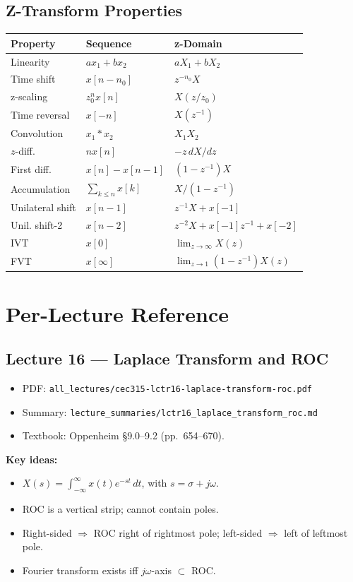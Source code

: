\documentclass[11pt]{article}
\begin{document}
\subsection{Z-Transform Properties}
\begin{center}
\begin{tabular}{|l|l|l|}
\hline
Property & Sequence & z-Domain\\
\hline
Linearity & $ax_1+bx_2$ & $aX_1+bX_2$\\
Time shift & $x[n-n_0]$ & $z^{-n_0}X$\\
z-scaling & $z_0^n x[n]$ & $X(z/z_0)$\\
Time reversal & $x[-n]$ & $X(z^{-1})$\\
Convolution & $x_1*x_2$ & $X_1 X_2$\\
$z$-diff. & $nx[n]$ & $-z\,dX/dz$\\
First diff. & $x[n]-x[n-1]$ & $(1-z^{-1})X$\\
Accumulation & $\sum_{k\le n}x[k]$ & $X/(1-z^{-1})$\\
Unilateral shift & $x[n-1]$ & $z^{-1}X + x[-1]$\\
Unil. shift-2 & $x[n-2]$ & $z^{-2}X + x[-1]z^{-1}+x[-2]$\\
IVT & $x[0]$ & $\lim_{z\to\infty}X(z)$\\
FVT & $x[\infty]$ & $\lim_{z\to 1}(1-z^{-1})X(z)$\\
\hline
\end{tabular}
\end{center}

\section{Per-Lecture Reference}

\subsection{Lecture 16 --- Laplace Transform and ROC}
\begin{itemize}[leftmargin=*]
  \item PDF: \texttt{all\_lectures/cec315-lctr16-laplace-transform-roc.pdf}
  \item Summary: \texttt{lecture\_summaries/lctr16\_laplace\_transform\_roc.md}
  \item Textbook: Oppenheim \S 9.0--9.2 (pp.~654--670).
\end{itemize}
\textbf{Key ideas:}
\begin{itemize}[leftmargin=*]
  \item $X(s) = \int_{-\infty}^\infty x(t)e^{-st}\,dt$, with $s = \sigma + j\omega$.
  \item ROC is a vertical strip; cannot contain poles.
  \item Right-sided $\Rightarrow$ ROC right of rightmost pole; left-sided $\Rightarrow$ left of leftmost pole.
  \item Fourier transform exists iff $j\omega$-axis $\subset$ ROC.
\end{itemize}
\end{document}

